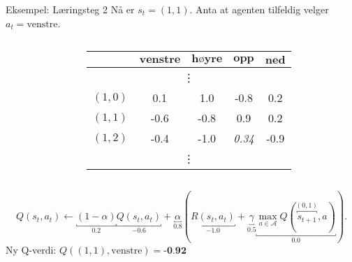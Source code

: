 \documentclass[UKenglish]{beamer}
\begin{document}
\begin{frame}{Eksempel: Læringsteg 2}
	Nå er $s_t=(1,1)$. Anta at agenten tilfeldig velger $a_t=\text{venstre}$.
	\vspace{-1em}
	\begin{columns}
		\begin{column}{0.4\textwidth}
			\begin{center}
				
			\end{center}
		\end{column}
		\begin{column}{0.6\textwidth}%
			\begin{table}[!hbt]
				\centering
				\def\arraystretch{1.0}
				\setlength{}
				\begin{tabular}{|c|c|c|c|c|}\hline
					\diagbox{$\textbf{s}$}{$\textbf{a}$} & $\textbf{venstre}$ & $\textbf{høyre}$ & $\textbf{opp}$ & $\textbf{ned}$\\ \hline
					\multicolumn{5}{|c|}{\vdots} \\ \hline
					$(1,0)$ & 0.1 & 1.0 & -0.8 & 0.2 \\ \hline
					\rowcolor{orange!35}$(1,1)$ & \cellcolor{orange!70}-0.6 & -0.8 & 0.9 & 0.2 \\ \hline
					$(1,2)$ & -0.4 & -1.0 & \textit{0.34} & -0.9 \\ \hline
					\multicolumn{5}{|c|}{\vdots}\\ \hline
				\end{tabular}
			\end{table}
		\end{column}
	\end{columns}		
	$$
	Q(s_t, a_t)\leftarrow\underbracket{(1-\alpha)}_{0.2}\underbracket{Q(s_t, a_t)}_{-0.6}+\underbracket{\alpha}_{0.8}\left(\underbracket{R(s_t, a_t)}_{-1.0}+\underbracket{\gamma}_{0.5}\underbracket{\max_{a\in\mathcal{A}} Q(\overbracket{s_{t+1}}^{(0,1)}, a)}_{0.0}\right).
	$$
	Ny Q-verdi: $Q((1,1), \text{venstre})=\textbf{-0.92}$
\end{frame}
\end{document}
